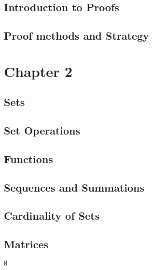 \documentclass[11pt]{article}
\begin{document}
\subsection{Introduction to Proofs}
\label{sec-1-7}
\subsection{Proof methods and Strategy}
\label{sec-1-8}
\section{Chapter 2}
\label{sec-2}
\subsection{Sets}
\label{sec-2-1}
\subsection{Set Operations}
\label{sec-2-2}
\subsection{Functions}
\label{sec-2-3}
\subsection{Sequences and Summations}
\label{sec-2-4}
\subsection{Cardinality of Sets}
\label{sec-2-5}
\subsection{Matrices}
\label{sec-2-6}




$\emptyset$
\end{document}
